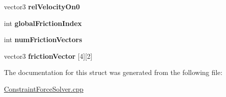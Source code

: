 \begin{DoxyCompactItemize}
\item 
\hypertarget{structOpenHRP_1_1CFSImpl_1_1ConstraintPoint_a77654f4b9629d35adea36cd1a0bdf5f5}{vector3 {\bfseries rel\-Velocity\-On0}}\label{structOpenHRP_1_1CFSImpl_1_1ConstraintPoint_a77654f4b9629d35adea36cd1a0bdf5f5}

\item 
\hypertarget{structOpenHRP_1_1CFSImpl_1_1ConstraintPoint_abf58ca6d8cb463ca850c34a8e7de2178}{int {\bfseries global\-Friction\-Index}}\label{structOpenHRP_1_1CFSImpl_1_1ConstraintPoint_abf58ca6d8cb463ca850c34a8e7de2178}

\item 
\hypertarget{structOpenHRP_1_1CFSImpl_1_1ConstraintPoint_a5cfd554160e463c46aed62a24d1c7fe7}{int {\bfseries num\-Friction\-Vectors}}\label{structOpenHRP_1_1CFSImpl_1_1ConstraintPoint_a5cfd554160e463c46aed62a24d1c7fe7}

\item 
\hypertarget{structOpenHRP_1_1CFSImpl_1_1ConstraintPoint_a944dab649a918df1504326e70f9abd8c}{vector3 {\bfseries friction\-Vector} \mbox{[}4\mbox{]}\mbox{[}2\mbox{]}}\label{structOpenHRP_1_1CFSImpl_1_1ConstraintPoint_a944dab649a918df1504326e70f9abd8c}

\end{DoxyCompactItemize}


The documentation for this struct was generated from the following file\-:\begin{DoxyCompactItemize}
\item 
\hyperlink{ConstraintForceSolver_8cpp}{Constraint\-Force\-Solver.\-cpp}\end{DoxyCompactItemize}
